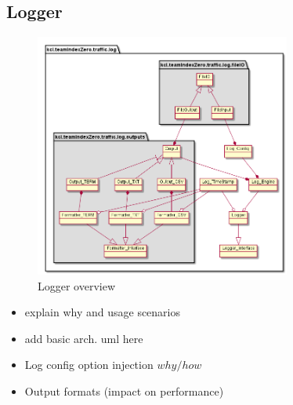 \subsection{Logger}
\begin{figure}
	\vspace{1.5em}
  	\caption{Logger overview}
  	\label{fig:logger_overview}
  	\centering
	\includegraphics[width=0.75\textwidth]{figs/logger/LogModuleObjectDiagram.png}
  	\vspace{1.5em}
\end{figure}

\begin{itemize}
    \item explain why and usage scenarios
    \item add basic arch. uml here
    \item Log config option injection \(why/how\)
    \item Output formats (impact on performance)
\end{itemize}

